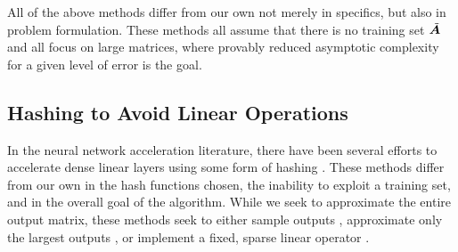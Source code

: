 All of the above methods differ from our own not merely in specifics, but also in problem formulation. These methods all assume that there is no training set $\tilde{\bm{A}}$ and all focus on large matrices, where provably reduced asymptotic complexity for a given level of error is the goal. %

\subsection{Hashing to Avoid Linear Operations}

In the neural network acceleration literature, there have been several efforts to accelerate dense linear layers using some form of hashing \cite{springScalable,slide,wtaSoftmax,googleWtaCvpr,hashnet}. These methods differ from our own in the hash functions chosen, the inability to exploit a training set, and in the overall goal of the algorithm. While we seek to approximate the entire output matrix, these methods seek to either sample outputs \cite{springScalable,slide}, approximate only the largest outputs \cite{wtaSoftmax,googleWtaCvpr}, or implement a fixed, sparse linear operator \cite{hashnet}.


